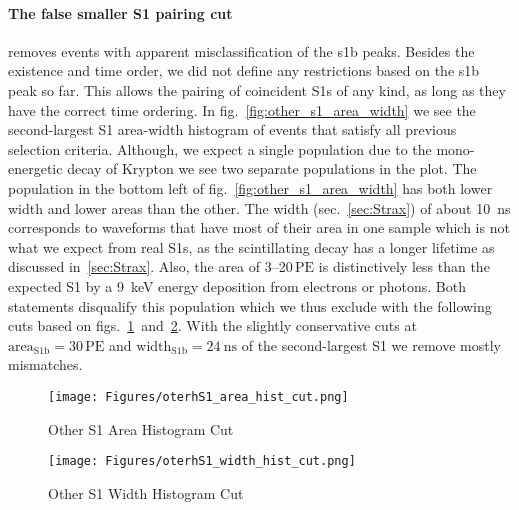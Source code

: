 \paragraph{The false smaller S1 pairing cut} removes events with apparent misclassification of the \gls{s1b} peaks.
Besides the existence and time order, we did not define any restrictions based on the \gls{s1b} peak so far.
This allows the pairing of coincident S1s of any kind, as long as they have the correct time ordering.
In fig.~\ref{fig:other_s1_area_width} we see the second-largest S1 area-width histogram of events that satisfy all previous selection criteria.
Although, we expect a single population due to the mono-energetic decay of Krypton we see two separate populations in the plot.
The population in the bottom left of fig.~\ref{fig:other_s1_area_width} has both lower width and lower areas than the other.
The width (sec.~\ref{sec:Strax}) of about \SI{10}{\nano\s} corresponds to waveforms that have most of their area in one sample which is not what we expect from real S1s, as the scintillating decay has a longer lifetime as discussed in~\ref{sec:Strax}.
Also, the area of \numrange{3}{20}$\,\mathrm{PE}$ is distinctively less than the expected S1 by a \SI{9}{\kilo\electronvolt} energy deposition from electrons or photons.
Both statements disqualify this population which we thus exclude with the following cuts based on figs.~\ref{fig:other_s1_area_cut}~and~\ref{fig:other_s1_width_cut}.
With the slightly conservative cuts at $ \mathrm{area}_\mathrm{S1b} = 30\,\mathrm{PE}$ and $ \mathrm{width}_\mathrm{S1b} = \SI{24}{\nano\s} $ of the second-largest S1 we remove mostly mismatches.


\begin{figure}[h]
\centering
\texttt{[image: Figures/oterhS1\_area\_hist\_cut.png]}  %
\caption[Other S1 Area Histogram Cut]{
        Other S1 Area Histogram Cut
    }
\label{fig:other_s1_area_cut}
\end{figure}


\begin{figure}
\centering
\texttt{[image: Figures/oterhS1\_width\_hist\_cut.png]}  %
\caption[Other S1 Width Histogram Cut]{
        Other S1 Width Histogram Cut
    }
\label{fig:other_s1_width_cut}
\end{figure}


